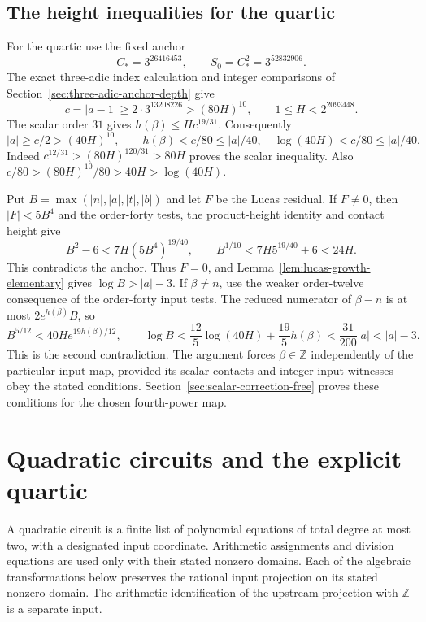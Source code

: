 \documentclass[11pt,a4paper]{article}
\theoremstyle{definition}
\theoremstyle{remark}
\begin{document}
\subsection{The height inequalities for the quartic}

For the quartic use the fixed anchor
\[
 C_*=3^{26416453},\qquad S_0=C_*^2=3^{52832906}.
\]
The exact three-adic index calculation and integer comparisons of
Section~\ref{sec:three-adic-anchor-depth} give
\[
 c=|a-1|\ge2\cdot3^{13208226}>(80H)^{10},\qquad
             1\le H<2^{2093448}.
\]
The scalar order $31$ gives $h(\beta)\le Hc^{19/31}$.
Consequently
\[
 |a|\ge c/2>(40H)^{10},\qquad
 h(\beta)<c/80\le |a|/40,
 \quad\log(40H)<c/80\le |a|/40.
\]
Indeed $c^{12/31}>(80H)^{120/31}>80H$ proves the scalar
inequality. Also $c/80>(80H)^{10}/80>40H>\log(40H)$.

Put $B=\max(|n|,|a|,|t|,|b|)$ and let $F$ be the Lucas
residual. If $F\ne0$, then $|F|<5B^4$ and the order-forty
tests, the product-height identity and contact height give
\[
 B^2-6<7H(5B^4)^{19/40},\qquad
 B^{1/10}<7H5^{19/40}+6<24H.
\]
This contradicts the anchor. Thus $F=0$, and Lemma~\ref{lem:lucas-growth-elementary} gives $\log B>|a|-3$.
If $\beta\ne n$, use the weaker order-twelve consequence of
the order-forty input tests. The reduced numerator of
$\beta-n$ is at most $2e^{h(\beta)}B$, so
\[
 B^{5/12}<40H e^{19h(\beta)/12},\qquad
 \log B<\frac{12}{5}\log(40H)+\frac{19}{5}h(\beta)
       <\frac{31}{200}|a|<|a|-3.
\]
This is the second contradiction. The argument forces
$\beta\in\mathbb Z$ independently of the particular input map,
provided its scalar contacts and integer-input witnesses obey the
stated conditions. Section~\ref{sec:scalar-correction-free}
proves these conditions for the chosen fourth-power map.



\section{Quadratic circuits and the explicit quartic}
\label{sec:quartic-compression}

A quadratic circuit is a finite list of polynomial equations of total
degree at most two, with a designated input coordinate. Arithmetic
assignments and division equations are used only with their stated
nonzero domains. Each of the algebraic transformations below preserves the
rational input projection on its stated nonzero domain. The arithmetic identification of the
upstream projection with $\mathbb Z$ is a separate input.
\end{document}
